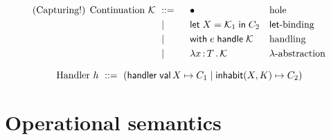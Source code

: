 \documentclass[11pt]{article}
\newcommand{\bnf}{\ \mathrel{{:}{:}{=}}\ }
\newcommand{\bnfor}{\ \mid\ \ }
\newcommand{\x}{x}     %
\newcommand{\C}{C}     %
\newcommand{\K}{K}     %
\newcommand{\X}{X}     %
\newcommand{\e}{e}     %
\newcommand{\rgn}{r}   %
\newcommand{\h}{h}     %
\newcommand{\T}{T}     %
\newcommand{\val}{\mathsf{val}\,} %
\newcommand{\letin}[1]{\mathsf{let}\; #1 \;\mathsf{in}\;} %
\newcommand{\inhabitPat}[2]{\mathsf{inhabit}(#1, #2)} %
\newcommand{\withhandle}[1]{\mathsf{with}\;#1\;\mathsf{handle}\;} %
\newcommand{\abs}[1]{\mathsf{abs}\;#1\;\mathsf{in}\;} %
\newcommand{\lam}[2]{\lambda #1 \,{:}\, #2 \,.\,} %
\newcommand{\handler}[5]{\mathsf{handler}\; \val #1 \mapsto #2 \mid \inhabitPat{#3}{#4} \mapsto #5}
\newcommand{\cont}{{\cal K}}     %
\newcommand{\hole}{\bullet}
\newcommand{\typicalhandler}{\handler{\X}{\C_1}{\X}{\K}{\C_2}}
\begin{document}
%
\begin{equation*}
  \text{(Capturing!) Continuation $\cont$}
  \begin{aligned}[t]
    &\bnf   {} && \hole                && \text{hole} \\
    &\bnfor {} && \letin{\X = \cont_1} \C_2  && \text{$\mathsf{let}$-binding} \\
    &\bnfor {} && \withhandle{\e} \cont && \text{handling} \\
    &\bnfor {} && \lam{\x}{\T} \cont   && \text{$\lambda$-abstraction} \\
  \end{aligned}
\end{equation*}

%
\begin{equation*}
  \text{Handler $\h$}
  \bnf (\typicalhandler)\\
\end{equation*}



\section{Operational semantics}
\label{sec:oper-semant}
\end{document}
